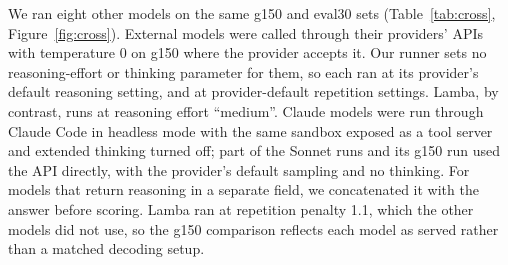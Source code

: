 \documentclass[11pt]{article}
\begin{document}
We ran eight other models on the same g150 and eval30 sets (Table~\ref{tab:cross}, Figure~\ref{fig:cross}). External models were called through their providers' APIs with temperature 0 on g150 where the provider accepts it. Our runner sets no reasoning-effort or thinking parameter for them, so each ran at its provider's default reasoning setting, and at provider-default repetition settings. Lamba, by contrast, runs at reasoning effort ``medium''. Claude models were run through Claude Code in headless mode with the same sandbox exposed as a tool server and extended thinking turned off; part of the Sonnet runs and its g150 run used the API directly, with the provider's default sampling and no thinking. For models that return reasoning in a separate field, we concatenated it with the answer before scoring. Lamba ran at repetition penalty 1.1, which the other models did not use, so the g150 comparison reflects each model as served rather than a matched decoding setup.
\end{document}
